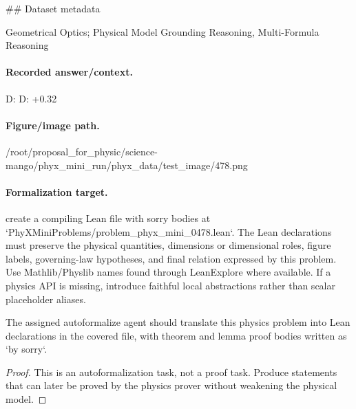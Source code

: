 \#\# Dataset metadata

Geometrical Optics; Physical Model Grounding Reasoning, Multi-Formula Reasoning

\paragraph{Recorded answer/context.}
D: D: +0.32

\paragraph{Figure/image path.}
/root/proposal\_for\_physic/science-mango/phyx\_mini\_run/phyx\_data/test\_image/478.png

\paragraph{Formalization target.}
create a compiling Lean file with sorry bodies at `PhyXMiniProblems/problem\_phyx\_mini\_0478.lean`. The Lean declarations must preserve the physical quantities, dimensions or dimensional roles, figure labels, governing-law hypotheses, and final relation expressed by this problem.
Use Mathlib/Physlib names found through LeanExplore where available. If a physics API is missing, introduce faithful local abstractions rather than scalar placeholder aliases.

\begin{theorem}
\label{thm:physics:phyx_mini_0478:target}
The assigned autoformalize agent should translate this physics problem into Lean declarations in the covered file, with theorem and lemma proof bodies written as `by sorry`.
\end{theorem}
\begin{proof}
This is an autoformalization task, not a proof task. Produce statements that can later be proved by the physics prover without weakening the physical model.
\end{proof}

